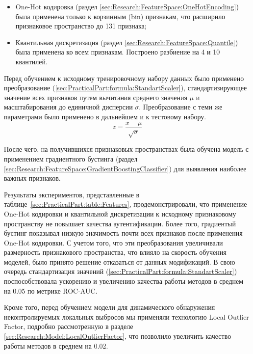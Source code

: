 \documentclass[12pt]{article}
\begin{document}
    \begin{itemize}
        \item One-Hot кодировка (раздел \ref{sec:Research:FeatureSpace:OneHotEncoding}) была применена только к корзинным (bin) признакам, что расширило признаковое пространство до 131 признака;
        \item Квантильная дискретизация (раздел \ref{sec:Research:FeatureSpace:Quantile}) была применена ко всем признакам. Построено разбиение на 4 и 10 квантилей.
    \end{itemize}

    \par Перед обучением к исходному тренировочному набору данных было применено преобразование (\ref{sec:PracticalPart:formula:StandartScaler}), стандартизирующее значение всех признаков путем вычитания среднего значения $\mu$ и масштабирования до единичной дисперсии $\sigma$. Преобразование с теми же параметрами было применено в дальнейшем и к тестовому набору.
    \begin{equation}
    \label{sec:PracticalPart:formula:StandartScaler}
        z = \frac{x - \mu}{\sqrt{\sigma}}
    \end{equation}

    \par После чего, на получившихся признаковых пространствах была обучена модель с применением градиентного бустинга (раздел \ref{sec:Research:FeatureSpace:GradientBoostingClassifier}) для выявления наиболее важных признаков.

    \par Результаты экспериментов, представленные в таблице~\ref{sec:PracticalPart:table:Features}, продемонстрировали, что применение One-Hot кодировки и квантильной дискретизации к исходному признаковому пространству не повышает качества аутентификации. Более того, градиентый бустинг показывал низкую значимость почти всех признаков после применения One-Hot кодировки. С учетом того, что эти преобразования увеличивали размерность признакового пространства, что влияло на скорость обучения моделей, было принято решение отказаться от данных модификаций. В свою очередь стандартизация значений (\ref{sec:PracticalPart:formula:StandartScaler}) поспособствовала ускорению и увеличению качества работы методов в среднем на 0.05 по метрике ROC-AUC.

    \par Кроме того, перед обучением модели для динамического обнаружения неконтролируемых локальных выбросов мы применяли технологию Local Outlier Factor, подробно рассмотренную в разделе \ref{sec:Research:Model:LocalOutlierFactor}, что позволило увеличить качество работы методов в среднем на 0.02.
\end{document}
